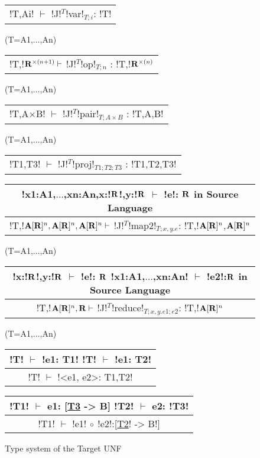 \begin{figure*}[tb]
    \centering
    \begin{tabular}{c} 
        \\\hline
        !T,Ai! $\vdash$ !J!$^T$!var!$_{T;i}$: !T!
        \end{tabular}(T=A1,$\ldots$,An)
        \hspace{0.5cm}
        \begin{tabular}{c}
            \\\hline
            !T,!$\mathbf{R}^{\times(n+1)} \vdash$ !J!$^T$!op!$_{T;n}$ : !T,!$\mathbf{R}^{\times(n)}$
        \end{tabular}(T=A1,$\ldots$,An)
    
        \begin{tabular}{c}
            \\\hline
            !T,A$\times$B! $\vdash$ !J!$^T$!pair!$_{T;A\times B}$ : !T,A,B!
        \end{tabular}(T=A1,$\ldots$,An)
    
        \begin{tabular}{c}
            \\\hline
            !T1,T3! $\vdash$ !J!$^T$!proj!$_{T1;T2;T3}$ : !T1,T2,T3!
        \end{tabular}
    
        \begin{tabular}{c}
            !x1:A1,$\ldots$,xn:An,x:!$\mathbf{R}$!,y:!$\mathbf{R}$ $\vdash$ !e!: $\mathbf{R}$ \quad in Source Language
            \\\hline  
            !T,!$\mathbf{A}[\mathbf{R}]^{n},\mathbf{A}[\mathbf{R}]^{n},\mathbf{A}[\mathbf{R}]^{n} \vdash$ !J!$^T$!map2!$_{T; x,y.e}$: !T,!$\mathbf{A}[\mathbf{R}]^{n}$,$\mathbf{A}[\mathbf{R}]^{n}$
        \end{tabular}(T=A1,$\ldots$,An)
    
        \begin{tabular}{c}
            !x:!$\mathbf{R}$!,y:!$\mathbf{R}$ $\vdash$ !e!: $\mathbf{R}$ \quad !x1:A1,$\ldots$,xn:An! $\vdash$ !e2!:$\mathbf{R}$ \quad in Source Language
            \\\hline  
            !T,!$\mathbf{A}[\mathbf{R}]^{n},\mathbf{R} \vdash$ !J!$^T$!reduce!$_{T; x,y.e1; e2}$: !T,!$\mathbf{A}[\mathbf{R}]^{n}$
        \end{tabular}(T=A1,$\ldots$,An)

        \begin{tabular}{c}
            !T! $\vdash$ !e1: T1!  \quad !T! $\vdash$ !e1: T2!
            \\ \hline
            !T! $\vdash$ !<e1, e2>: T1,T2!
        \end{tabular}
        \hspace{0.5cm}
        \begin{tabular}{c}
            !T1! $\vdash$ e1: [\underline{T3} -> B]  \quad !T2! $\vdash$ e2: !T3! 
            \\ \hline
            !T1! $\vdash$ !e1! $\circ$ !e2!:[\underline{T2}! -> B!]
        \end{tabular}

    \vspace{-0.2cm}
    \caption{Type system of the Target UNF}
    \vspace{-0.4cm}
    \label{fig:target_unf_typesystem}
    \end{figure*}